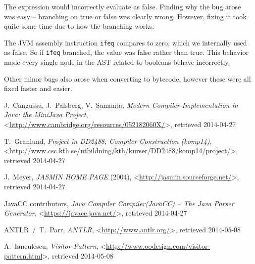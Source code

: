 \documentclass[a4paper]{article}
\begin{document}
The expression would incorrectly evaluate as false. Finding why the
bug arose was easy -- branching on true or false was clearly wrong. However,
fixing it took quite some time due to how the branching works.

The JVM assembly instruction \texttt{ifeq} compares to zero, which we internally
used as false. So if \texttt{ifeq} branched, the value was false rather than
true. This behavior made every single node in the AST related to booleans behave
incorrectly.

Other minor bugs also arose when converting to bytecode, however these were all
fixed faster and easier.

\begin{thebibliography}{99}

    J.~Cangussu, J.~Palsberg, V.~Samanta,
    \emph{Modern Compiler Implementation in Java: the MiniJava Project},
    <\url{http://www.cambridge.org/resources/052182060X/}>, retrieved 2014-04-27

    T.~Granlund,
    \emph{Project in DD2488, Compiler Construction (komp14)},
    <\url{http://www.csc.kth.se/utbildning/kth/kurser/DD2488/komp14/project/}>, retrieved 2014-04-27

    J.~Meyer,
    \emph{JASMIN HOME PAGE} (2004),
    <\url{http://jasmin.sourceforge.net/}>, retrieved 2014-04-27

    JavaCC contributors,
    \emph{Java Compiler Compiler\texttrademark (JavaCC\texttrademark) -- The Java Parser Generator},
    <\url{https://javacc.java.net/}>, retrieved 2014-04-27

    ANTLR~/~T.~Parr,
    \emph{ANTLR},
    <\url{http://www.antlr.org/}>, retrieved 2014-05-08

    A.~Ianculescu,
    \emph{Visitor Pattern},
    <\url{http://www.oodesign.com/visitor-pattern.html}>, retrieved 2014-05-08

\end{thebibliography}
\end{document}
